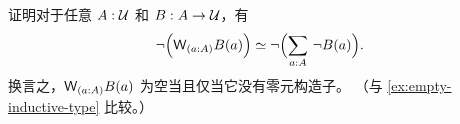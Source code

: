 \begin{ex}\label{ex:no-nullary-constructor}
  证明对于任意 $A:\mathcal{U}$ 和 $B:A\to\mathcal{U}$，有
  \[ \eqv{\neg\Parens{\wtype{a:A} B(a)}}{\neg\Parens{\sm{a:A} \neg B(a)}}. \]
  换言之，$\wtype{a:A} B(a)$ 为空当且仅当它没有零元构造子。
  （与 \cref{ex:empty-inductive-type} 比较。）
\end{ex}

